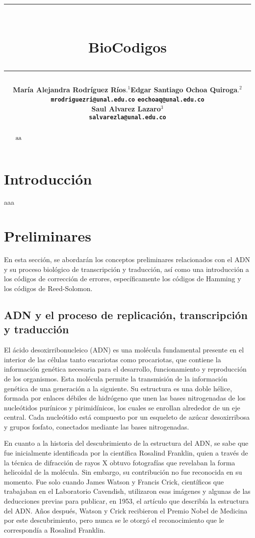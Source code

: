 \documentclass[12pt]{article}
\title{\vspace{-2cm}\par\noindent\rule{16cm}{1pt}\large
\\\bfseries BioCodigos
\vspace{-0.34cm}\par\noindent\hspace{0.15cm}\rule{16cm}{1pt}
\vspace{-0.6cm}
}
\author{\small \bfseries María Alejandra Rodríguez Ríos$.^1$\quad \quad\small Edgar Santiago Ochoa Quiroga$.^{2}$\\ \small \quad \texttt{mrodriguezri@unal.edu.co} \quad \quad \quad \quad \quad \quad \texttt{eochoaq@unal.edu.co}\quad\quad \quad\\ \small \bfseries Saul Alvarez Lazaro$^{3}$\\
\small \texttt{salvarezla@unal.edu.co}
}
\begin{document}
\maketitle
\begin{abstract}
aa
\end{abstract}

\section{Introducción}

aaa



\section{Preliminares}
En esta sección, se abordarán los conceptos preliminares relacionados con el ADN y su proceso biológico de transcripción y traducción, así como una introducción a los códigos de corrección de errores, específicamente los códigos de Hamming y los códigos de Reed-Solomon.
\subsection{ADN y el proceso de replicación, transcripción y traducción}

El ácido desoxirribonucleico (ADN) es una molécula fundamental presente en el interior de las células tanto eucariotas como procariotas, que contiene la información genética necesaria para el desarrollo, funcionamiento y reproducción de los organismos. Esta molécula permite la transmisión de la información genética de una generación a la siguiente. Su estructura es una doble hélice, formada por enlaces débiles de hidrógeno que unen las bases nitrogenadas de los nucleótidos purínicos y pirimidínicos, los cuales se enrollan alrededor de un eje central. Cada nucleótido está compuesto por un esqueleto de azúcar desoxirribosa y grupos fosfato, conectados mediante las bases nitrogenadas.

En cuanto a la historia del descubrimiento de la estructura del ADN, se sabe que fue inicialmente identificada por la científica Rosalind Franklin, quien a través de la técnica de difracción de rayos X obtuvo fotografías que revelaban la forma helicoidal de la molécula. Sin embargo, su contribución no fue reconocida en su momento. Fue solo cuando James Watson y Francis Crick, científicos que trabajaban en el Laboratorio Cavendish, utilizaron esas imágenes y algunas de las deducciones previas para publicar, en 1953, el artículo que describía la estructura del ADN. Años después, Watson y Crick recibieron el Premio Nobel de Medicina por este descubrimiento, pero nunca se le otorgó el reconocimiento que le correspondía a Rosalind Franklin.
\end{document}

